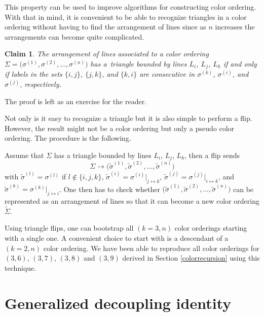 \documentclass[pdftex]{sigma}
\newtheorem*{claim}{Claim}
\theoremstyle{definition}
\numberwithin{equation}{section}
\begin{document}
This property can be used to improve algorithms for constructing color ordering. With that in mind, it is convenient to be able to recognize triangles in a color ordering without having to find the arrangement of lines since as $n$ increases the arrangements can become quite complicated.

\begin{claim}
The arrangement of lines associated to a color ordering $\Sigma =\big( \sigma^{(1)},\sigma^{(2)},\dots ,\sigma^{(n)} \big)$ has a~triangle bounded by lines $L_i$, $L_j$, $L_k$ if and only if labels in the sets $\{ i,j\}$, $\{ j,k\} $, and $\{ k,i\}$
are consecutive in $\sigma^{(k)}$, $\sigma^{(i)}$, and $\sigma^{(j)}$, respectively.
\end{claim}

The proof is left as an exercise for the reader.

Not only is it easy to recognize a triangle but it is also simple to perform a flip. However, the result might not be a color ordering but only a pseudo color ordering. The procedure is the following.

Assume that $\Sigma$ has a triangle bounded by lines $L_i$, $L_j$, $L_k$, then a flip sends
\[
\Sigma \longrightarrow \big( \tilde\sigma^{(1)},\tilde\sigma^{(2)},\dots ,\tilde\sigma^{(n)} \big)
\]
with $\tilde\sigma^{(l)}=\sigma^{(l)}$ if $l\notin \{i,j,k\}$, $\tilde\sigma^{(i)} = \sigma^{(i)}|_{j\leftrightarrow k}$, $\tilde\sigma^{(j)} = \sigma^{(j)}|_{i\leftrightarrow k}$, and $\tilde\sigma^{(k)} = \sigma^{(k)}|_{j\leftrightarrow i}$.
One then has to check whether $\big( \tilde\sigma^{(1)},\tilde\sigma^{(2)},\dots ,\tilde\sigma^{(n)} \big)$ can be represented as an arrangement of lines so that it can become a new color ordering $\tilde\Sigma$.

Using triangle flips, one can bootstrap all $(k=3,n)$ color orderings starting with a single one. A convenient choice to start with is a descendant of a $(k=2,n)$ color ordering. We have been able to reproduce all color orderings for $(3,6)$, $(3,7)$, $(3,8)$ and $(3,9)$ derived in Section \ref{colorrecursion} using this technique.

\section{Generalized decoupling identity}\label{sec7}
\end{document}
